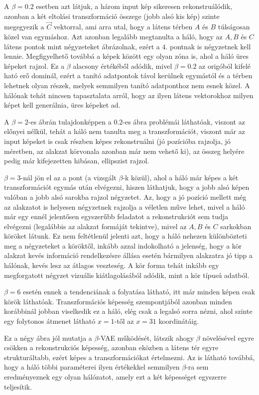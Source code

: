 A $\beta=0.2$ esetben azt látjuk, a három input kép sikeresen rekonstruálódik, azonban a két eltolási transzformáció összege (jobb alsó kis kép) szinte megegyezik a $\vec{C}$ vektorral, ami arra utal, hogy a látens térben $A$ és $B$ túlságosan közel van egymáshoz. Azt azonban legalább megtanulta a háló, hogy az $A, B$ és $C$ látens pontok mint négyzeteket ábrázolnak, ezért a $4$. pontnak is négyzetnek kell lennie. Megfigyelhető továbbá a képek között egy olyan zóna is, ahol a háló üres képeket rajzol. Ez a $\beta$ alacsony értékéből adódik, mivel $\beta=0.2$ az origóból kifelé ható erő dominál, ezért a tanító adatpontok távol kerülnek egymástól és a térben lehetnek olyan részek, melyek semmilyen tanító adatponthoz nem esnek közel. A hálónak tehát nincsen tapasztalata arról, hogy az ilyen látens vektorokhoz milyen képet kell generálnia, üres képeket ad.

A $\beta=2$-es ábrán tulajdonképpen a $0.2$-es ábra problémái láthatóak, viszont az előnyei nélkül, tehát a háló nem tanulta meg a transzformációt, viszont már az input képeket is csak részben képes rekonstruálni (jó pozícióba rajzolja, jó méretben, az alakzat körvonala azonban már nem vehető ki), az összeg helyére pedig már kifejezetten hibásan, ellipszist rajzol.

$\beta=3$-nál jön el az a pont (a vizsgált $\beta$-k közül), ahol a háló már képes a két transzformációt egymás után elvégezni, hiszen láthatjuk, hogy a jobb alsó képen valóban a jobb alsó sarokba rajzol négyzetet. Az, hogy a jó pozíció mellett még az alakzatot is helyesen négyzetnek rajzolja a véletlen műve lehet, mivel a háló már egy ennél jelentősen egyszerűbb feladatot a rekonstrukciót sem tudja elvégezni (legalábbis az alakzat formáját tekintve), mivel az $A, B$ és $C$ sarkokban köröket látunk. Ez nem feltétlenül jelenti azt, hogy a háló nehezen különbözteti meg a négyzeteket a köröktől, inkább azzal indokolható a jelenség, hogy a kör alakzat kevés információ rendelkezésre állása esetén bármilyen alakzatra jó tipp a hálónak, kevés lesz az átlagos veszteség. A kör forma tehát inkább egy megforgatott négyzet vizuális kiátlagolásából adódik, mint a kör típusú adatból.

$\beta=6$ esetén ennek a tendenciának a folyatása látható, itt már minden képen csak körök láthatóak. Transzformációs képesség szempontjából azonban minden korábbinál jobban viselkedik ez a háló, elég csak a legalsó sorra nézni, ahol szinte egy folytonos átmenet látható $x=1$-től az $x=31$ koordinátáig.

Ez a négy ábra jól mutatja a $\beta$-VAE működését, látszik ahogy $\beta$ növelésével egyre csökken a rekonstrukciós képesség, azonban eközben a látens tér egyre strukturáltabb, ezért képes a transzformációkat értelmezni. Az is látható továbbá, hogy a háló többi paraméterei ilyen értékekkel semmilyen $\beta$-ra sem eredményeznek egy olyan hálózatot, amely ezt a két képességet egyszerre teljesítik.



